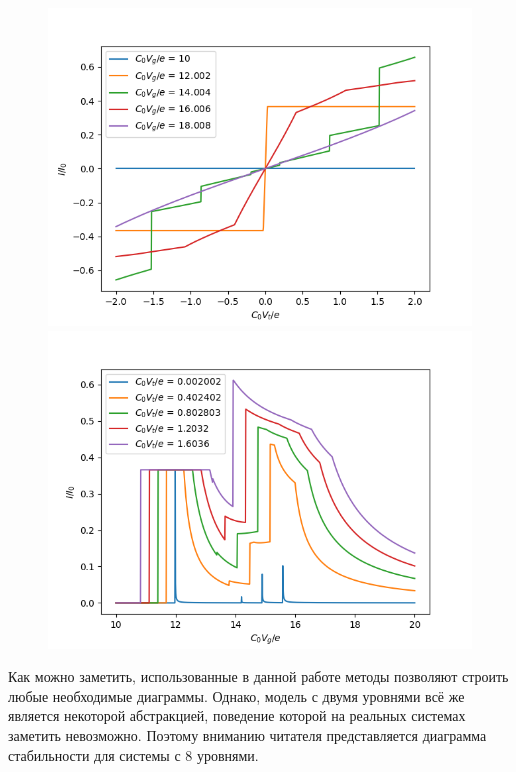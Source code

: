\documentclass[12pt,a4paper]{report}
\begin{document}
\begin{figure}[h!]
\begin{floatrow}
           {\includegraphics[scale = 0.5]{VAH 2lvl}}
           {\includegraphics[scale = 0.5]{signal 2lvl}}  
\end{floatrow}    
\end{figure}
Как можно заметить, использованные в данной работе методы позволяют строить любые необходимые диаграммы. Однако, модель с двумя уровнями всё же является некоторой абстракцией, поведение которой на реальных системах заметить невозможно. Поэтому вниманию читателя представляется диаграмма стабильности для системы с 8 уровнями.
\end{document}
